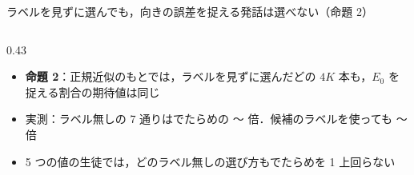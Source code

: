 \begin{frame}{ラベルを見ずに選んでも，向きの誤差を捉える発話は選べない（命題 2）}
\begin{columns}[T,onlytextwidth]
\begin{column}{0.43\textwidth}
      \begin{itemize}\scriptsize\setlength{\itemsep}{8pt}
        \item \textbf{命題 2}：正規近似のもとでは，ラベルを見ずに選んだどの $4K$ 本も，$E_0$ を捉える割合の期待値は同じ
        \item 実測：ラベル無しの 7 通りはでたらめの 〜 倍．候補のラベルを使っても 〜 倍
        \item 5 つの値の生徒では，どのラベル無しの選び方もでたらめを 1 \pt 上回らない
      \end{itemize}
    \end{column}
  \end{columns}
\end{frame}

